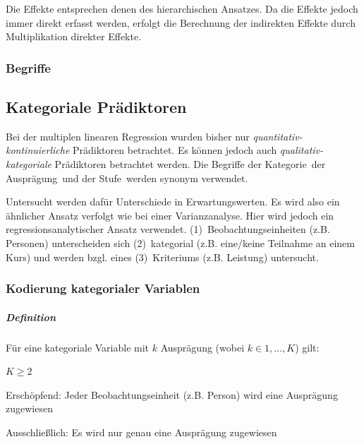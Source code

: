 \documentclass{article}
\numberwithin{equation}{section}
\begin{document}
Die Effekte entsprechen denen des hierarchischen Ansatzes. Da die Effekte jedoch immer direkt erfasst werden, erfolgt die Berechnung der indirekten Effekte durch Multiplikation direkter Effekte.

\subsubsection*{Begriffe}



\subsection{Kategoriale Prädiktoren}

Bei der multiplen linearen Regression wurden bisher nur \emph{quantitativ-kontinuierliche} Prädiktoren betrachtet. Es können jedoch auch \emph{qualitativ-kategoriale} Prädiktoren betrachtet werden. Die Begriffe der \glqq Kategorie\grqq\, der \glqq Ausprägung\grqq\ und der \glqq Stufe\grqq\ werden synonym verwendet.

Untersucht werden dafür Unterschiede in Erwartungswerten. Es wird also ein ähnlicher Ansatz verfolgt wie bei einer Varianzanalyse. Hier wird jedoch ein regressionsanalytischer Ansatz verwendet. (1)~Beobachtungseinheiten (z.B. Personen) unterscheiden sich (2)~kategorial (z.B. eine/keine Teilnahme an einem Kurs) und werden bzgl. eines (3)~Kriteriums (z.B. Leistung) untersucht.

\subsubsection{Kodierung kategorialer Variablen}

\subparagraph{Definition}

Für eine kategoriale Variable mit $k$ Ausprägung (wobei $k \in 1,\dots,K$) gilt:

\begin{compactitem}
\item $K \geq 2$
\item Erschöpfend: Jeder Beobachtungseinheit (z.B. Person) wird eine Ausprägung zugewiesen
\item Ausschließlich: Es wird nur genau eine Ausprägung zugewiesen
\end{compactitem}
\end{document}
